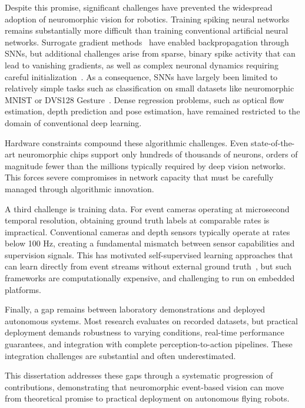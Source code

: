 
Despite this promise, significant challenges have prevented the widespread adoption of neuromorphic vision for robotics. Training spiking neural networks remains substantially more difficult than training conventional artificial neural networks. Surrogate gradient methods~\cite{neftci2019surrogate, zenke2021remarkable} have enabled backpropagation through SNNs, but additional challenges arise from sparse, binary spike activity that can lead to vanishing gradients, as well as complex neuronal dynamics requiring careful initialization~\cite{pfeiffer2018deep,tavanaei2019deep}. As a consequence, SNNs have largely been limited to relatively simple tasks such as classification on small datasets like neuromorphic MNIST or DVS128 Gesture~\cite{amir2017low}. Dense regression problems, such as optical flow estimation, depth prediction and pose estimation, have remained restricted to the domain of conventional deep learning.

Hardware constraints compound these algorithmic challenges. Even state-of-the-art neuromorphic chips support only hundreds of thousands of neurons, orders of magnitude fewer than the millions typically required by deep vision networks. This forces severe compromises in network capacity that must be carefully managed through algorithmic innovation.

A third challenge is training data. For event cameras operating at microsecond temporal resolution, obtaining ground truth labels at comparable rates is impractical. Conventional cameras and depth sensors typically operate at rates below 100 Hz, creating a fundamental mismatch between sensor capabilities and supervision signals. This has motivated self-supervised learning approaches that can learn directly from event streams without external ground truth~\cite{gallego2018unifying,zhu2019unsupervised}, but such frameworks are computationally expensive, and challenging to run on embedded platforms.

Finally, a gap remains between laboratory demonstrations and deployed autonomous systems. Most research evaluates on recorded datasets, but practical deployment demands robustness to varying conditions, real-time performance guarantees, and integration with complete perception-to-action pipelines. These integration challenges are substantial and often underestimated.

This dissertation addresses these gaps through a systematic progression of contributions, demonstrating that neuromorphic event-based vision can move from theoretical promise to practical deployment on autonomous flying robots.

